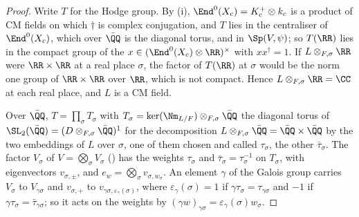 \begin{proof}
Write $T$ for the Hodge group. By (i), $\End^{0}(X_{c})
=K_{c}^{+}\otimes k_{c}$ is a product of CM fields on which $\dagger$ is
complex conjugation, and $T$ lies in the centraliser of $\End^{0}(X_{c})$,
which over $\bar{\QQ}$ is the diagonal torus, and in $\Sp(V,\psi)$; so
$T(\RR)$ lies in the compact group of the $x\in(\End^{0}(X_{c})\otimes\RR)
^{\times}$ with $xx^{\dagger}=1$. If $L\otimes_{F,\sigma}\RR$ were
$\RR\times\RR$ at a real place $\sigma$, the factor of $T(\RR)$ at $\sigma$
would be the norm one group of $\RR\times\RR$ over $\RR$, which is not
compact. Hence $L\otimes_{F,\sigma}\RR=\CC$ at each real place, and $L$ is a
CM field.

Over $\bar{\QQ}$, $T=\prod_{\sigma}T_{\sigma}$ with $T_{\sigma}
=\ker(\Nm_{L/F})\otimes_{F,\sigma}\bar{\QQ}$ the diagonal torus of
$\SL_{2}(\bar{\QQ})=(D\otimes_{F,\sigma}\bar{\QQ})^{1}$ for the decomposition
$L\otimes_{F,\sigma}\bar{\QQ}=\bar{\QQ}\times\bar{\QQ}$ by the two embeddings
of $L$ over $\sigma$, one of them chosen and called $\tau_{\sigma}$, the
other $\bar{\tau}_{\sigma}$. The factor $V_{\sigma}$ of
$V=\bigotimes_{\sigma}V_{\sigma}$ () has the weights
$\tau_{\sigma}$ and $\bar{\tau}_{\sigma}=\tau_{\sigma}^{-1}$ on $T_{\sigma}$,
with eigenvectors $v_{\sigma,\pm}$, and $e_{w}=\bigotimes_{\sigma}
v_{\sigma,w_{\sigma}}$. An element $\gamma$ of the Galois group carries
$V_{\sigma}$ to $V_{\gamma\sigma}$ and $v_{\sigma,+}$ to
$v_{\gamma\sigma,\varepsilon_{\gamma}(\sigma)}$, where
$\varepsilon_{\gamma}(\sigma)=1$ if $\gamma\tau_{\sigma}=\tau_{\gamma\sigma}$
and $-1$ if $\gamma\tau_{\sigma}=\bar{\tau}_{\gamma\sigma}$; so it acts on
the weights by $(\gamma w)_{\gamma\sigma}=\varepsilon_{\gamma}(\sigma)
w_{\sigma}$.


\end{proof}
